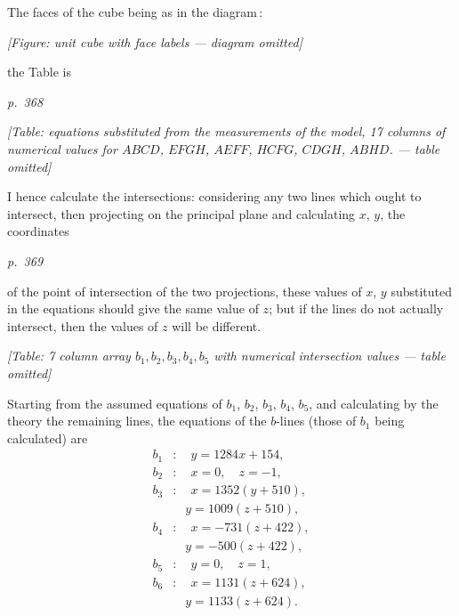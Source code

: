 \documentclass[11pt,a4paper]{article}
\theoremstyle{plain}
\theoremstyle{definition}
\begin{document}
The faces of the cube being as in the diagram\,:
\begin{center}
\textit{[Figure: unit cube with face labels --- diagram omitted]}
\end{center}
the Table is

\clearpage

\bigskip
\textit{p.~368}
\smallskip

\begin{center}
\textit{[Table: equations substituted from the measurements of the model, 17 columns of numerical}
\textit{values for $ABCD$, $EFGH$, $AEFF$, $HCFG$, $CDGH$, $ABHD$. --- table omitted]}
\end{center}

I hence calculate the intersections: considering any two lines which ought to
intersect, then projecting on the principal plane and calculating $x$, $y$, the coordinates

\clearpage

\bigskip
\textit{p.~369}
\smallskip

\noindent
of the point of intersection of the two projections, these values of $x$, $y$ substituted in
the equations should give the same value of $z$; but if the lines do not actually
intersect, then the values of $z$ will be different.

\begin{center}
\textit{[Table: 7 column array $b_1, b_2, b_3, b_4, b_5$ with numerical}
\textit{intersection values --- table omitted]}
\end{center}

Starting from the assumed equations of $b_1$, $b_2$, $b_3$, $b_4$, $b_5$, and calculating by the
theory the remaining lines, the equations of the $b$-lines (those of $b_1$ being calculated) are
\begin{align*}
b_1 &: \quad y = 1284 x + 154, \\
b_2 &: \quad x = 0, \quad z = -1, \\
b_3 &: \quad x = 1352(y + 510), \\
&\quad y = 1009(z + 510), \\
b_4 &: \quad x = -731(z + 422), \\
&\quad y = -500(z + 422), \\
b_5 &: \quad y = 0, \quad z = 1, \\
b_6 &: \quad x = 1131(z + 624), \\
&\quad y = 1133(z + 624).
\end{align*}

\clearpage
\end{document}
